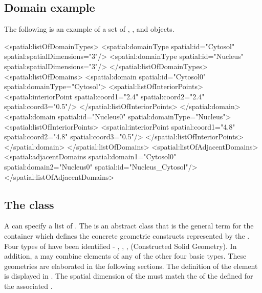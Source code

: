 \subsection{Domain example}
\label{domain-example}
The following is an example of a set of \Domain, \DomainType, and \AdjacentDomains objects.

\begin{example}
  <spatial:listOfDomainTypes>
    <spatial:domainType spatial:id="Cytosol" spatial:spatialDimensions="3"/>
    <spatial:domainType spatial:id="Nucleus" spatial:spatialDimensions="3"/>
  </spatial:listOfDomainTypes>
  <spatial:listOfDomains>
    <spatial:domain spatial:id="Cytosol0" spatial:domainType="Cytosol">
      <spatial:listOfInteriorPoints>
        <spatial:interiorPoint spatial:coord1="2.4" spatial:coord2="2.4" spatial:coord3="0.5"/>
      </spatial:listOfInteriorPoints>
    </spatial:domain>
    <spatial:domain spatial:id="Nucleus0" spatial:domainType="Nucleus">
      <spatial:listOfInteriorPoints>
        <spatial:interiorPoint spatial:coord1="4.8" spatial:coord2="4.8" spatial:coord3="0.5"/>
      </spatial:listOfInteriorPoints>
    </spatial:domain>
  </spatial:listOfDomains>
  <spatial:listOfAdjacentDomains>
    <spatial:adjacentDomains spatial:domain1="Cytosol0" spatial:domain2="Nucleus0"
                             spatial:id="Nucleus_Cytosol"/>
  </spatial:listOfAdjacentDomains>
\end{example}


\subsection{The  class}
\label{geometrydefinition-class}
A \Geometry can specify a list of \GeometryDefinitions. The \GeometryDefinition is an abstract class that is the general term for the container which defines the concrete geometric constructs represented by the \Geometry. Four types of \GeometryDefinitions have been identified - \AnalyticGeometry, \SampledFieldGeometry, \ParametricGeometry, \CSGeometry (Constructed Solid Geometry).  In addition, a \MixedGeometry may combine elements of any of the other four basic types.  These geometries are elaborated in the following sections. The definition of the \GeometryDefinition element is displayed in .  The spatial dimension of the \GeometryDefinition must match the  of the \DomainType defined for the associated \Domain.


